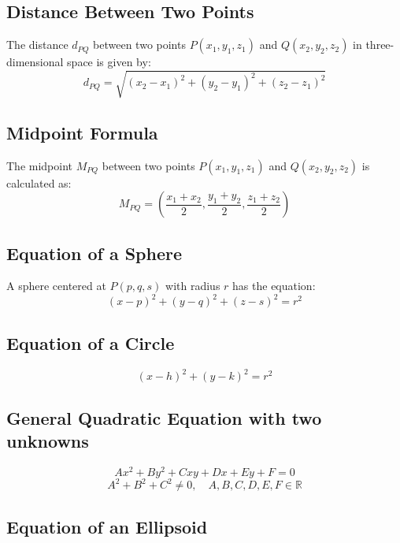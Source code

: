 \documentclass[a4paper,12pt,openany]{book}
\newcommand{\R}{\mathbb{R}}
\begin{document}
\subsection{Distance Between Two Points}

The distance \(d_{PQ}\) between two points \( P(x_1, y_1, z_1) \) and \( Q(x_2, y_2, z_2) \) in three-dimensional space is given by:
\begin{equation}
    d_{PQ} = \sqrt{(x_2 - x_1)^2 + (y_2 - y_1)^2 + (z_2 - z_1)^2}
\end{equation}

\subsection{Midpoint Formula}

The midpoint \(M_{PQ}\) between two points \( P(x_1, y_1, z_1) \) and \( Q(x_2, y_2, z_2) \) is calculated as:
\begin{equation}
    M_{PQ} = \left(\dfrac{x_1 + x_2}{2}, \dfrac{y_1 + y_2}{2}, \dfrac{z_1 + z_2}{2}\right)
\end{equation}

\subsection{Equation of a Sphere}

A sphere centered at \(P(p, q, s)\) with radius \( r \) has the equation:
\begin{equation}
    (x - p)^2 + (y - q)^2 + (z - s)^2 = r^2
\end{equation}

\subsection{Equation of a Circle}
\begin{equation}
    (x-h)^2 + (y-k)^2 = r^2
\end{equation}

\subsection{General Quadratic Equation with two unknowns}
\begin{equation}
    Ax^2 + By^2 + Cxy + Dx + Ey + F = 0
\end{equation}
\[
    A^2 + B^2 + C^2 \neq 0, \quad A, B, C, D, E, F \in \R
\]
\subsection{Equation of an Ellipsoid}
\end{document}
